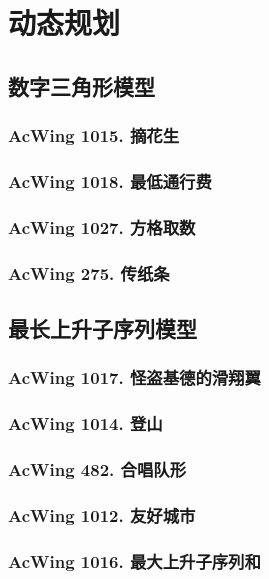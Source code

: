 \chapter{动态规划}


\section{数字三角形模型}

\subsection{AcWing 1015. 摘花生}

\subsection{AcWing 1018. 最低通行费}

\subsection{AcWing 1027. 方格取数}

\subsection{AcWing 275. 传纸条}


\section{最长上升子序列模型}

\subsection{AcWing 1017. 怪盗基德的滑翔翼}

\subsection{AcWing 1014. 登山}

\subsection{AcWing 482. 合唱队形}

\subsection{AcWing 1012. 友好城市}

\subsection{AcWing 1016. 最大上升子序列和}

